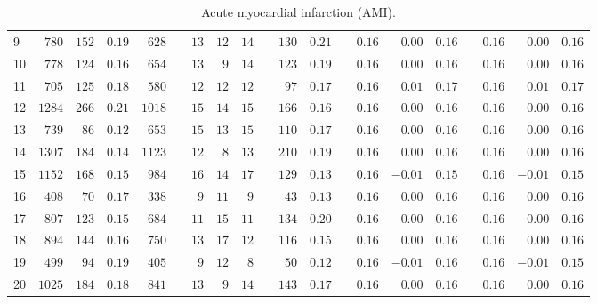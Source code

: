\documentclass[]{article}\usepackage[]{graphicx}\usepackage[]{color}
\begin{document}
\begin{landscape}
\begin{table}[!tbp]
\begin{center}
\begin{tabular}{lrrrrcrrrcrrcrrrcrrr}
9&$ 780$&$152$&$0.19$&$ 628$&&$13$&$12$&$14$&&$130$&$0.21$&&$0.16$&$ 0.00$&$0.16$&&$0.16$&$ 0.00$&$0.16$\tabularnewline
10&$ 778$&$124$&$0.16$&$ 654$&&$13$&$ 9$&$14$&&$123$&$0.19$&&$0.16$&$ 0.00$&$0.16$&&$0.16$&$ 0.00$&$0.16$\tabularnewline
11&$ 705$&$125$&$0.18$&$ 580$&&$12$&$12$&$12$&&$ 97$&$0.17$&&$0.16$&$ 0.01$&$0.17$&&$0.16$&$ 0.01$&$0.17$\tabularnewline
12&$1284$&$266$&$0.21$&$1018$&&$15$&$14$&$15$&&$166$&$0.16$&&$0.16$&$ 0.00$&$0.16$&&$0.16$&$ 0.00$&$0.16$\tabularnewline
13&$ 739$&$ 86$&$0.12$&$ 653$&&$15$&$13$&$15$&&$110$&$0.17$&&$0.16$&$ 0.00$&$0.16$&&$0.16$&$ 0.00$&$0.16$\tabularnewline
14&$1307$&$184$&$0.14$&$1123$&&$12$&$ 8$&$13$&&$210$&$0.19$&&$0.16$&$ 0.00$&$0.16$&&$0.16$&$ 0.00$&$0.16$\tabularnewline
15&$1152$&$168$&$0.15$&$ 984$&&$16$&$14$&$17$&&$129$&$0.13$&&$0.16$&$-0.01$&$0.15$&&$0.16$&$-0.01$&$0.15$\tabularnewline
16&$ 408$&$ 70$&$0.17$&$ 338$&&$ 9$&$11$&$ 9$&&$ 43$&$0.13$&&$0.16$&$ 0.00$&$0.16$&&$0.16$&$ 0.00$&$0.16$\tabularnewline
17&$ 807$&$123$&$0.15$&$ 684$&&$11$&$15$&$11$&&$134$&$0.20$&&$0.16$&$ 0.00$&$0.16$&&$0.16$&$ 0.00$&$0.16$\tabularnewline
18&$ 894$&$144$&$0.16$&$ 750$&&$13$&$17$&$12$&&$116$&$0.15$&&$0.16$&$ 0.00$&$0.16$&&$0.16$&$ 0.00$&$0.16$\tabularnewline
19&$ 499$&$ 94$&$0.19$&$ 405$&&$ 9$&$12$&$ 8$&&$ 50$&$0.12$&&$0.16$&$-0.01$&$0.16$&&$0.16$&$-0.01$&$0.15$\tabularnewline
20&$1025$&$184$&$0.18$&$ 841$&&$13$&$ 9$&$14$&&$143$&$0.17$&&$0.16$&$ 0.00$&$0.16$&&$0.16$&$ 0.00$&$0.16$\tabularnewline
\hline
\end{tabular}

\caption{Acute myocardial infarction (AMI).\label{round}}\end{center}

\end{table}



\end{landscape}
\end{document}
